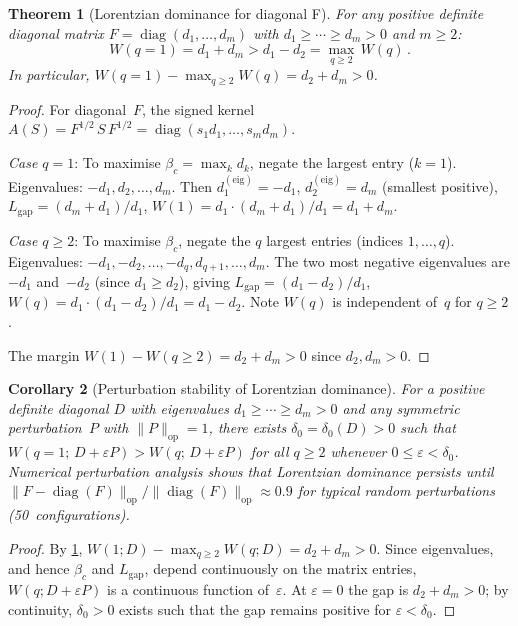 \documentclass[11pt]{article}
\newtheorem{theorem}{Theorem}[section]
\newtheorem{corollary}[theorem]{Corollary}
\theoremstyle{definition}
\theoremstyle{remark}
\begin{document}
\begin{theorem}[Lorentzian dominance for diagonal F]
\label{thm:diagonal-lorentzian}
For any positive definite diagonal matrix
$F = \operatorname{diag}(d_1, \ldots, d_m)$ with
$d_1 \geq \cdots \geq d_m > 0$ and $m \geq 2$:
\begin{equation}
\label{eq:diagonal-W-comparison}
W(q = 1) = d_1 + d_m > d_1 - d_2 = \max_{q \geq 2}\, W(q)\,.
\end{equation}
In particular, $W(q = 1) - \max_{q \geq 2} W(q) = d_2 + d_m > 0$.
\end{theorem}

\begin{proof}
For diagonal~$F$, the signed kernel
$A(S) = F^{1/2}\,S\,F^{1/2} = \operatorname{diag}(s_1 d_1,
\ldots, s_m d_m)$.

\emph{Case $q = 1$}: To maximise $\beta_c = \max_k d_k$,
negate the largest entry ($k = 1$).
Eigenvalues: $-d_1, d_2, \ldots, d_m$.
Then $d_1^{(\mathrm{eig})} = -d_1$,
$d_2^{(\mathrm{eig})} = d_m$ (smallest positive),
$L_{\mathrm{gap}} = (d_m + d_1)/d_1$,
$W(1) = d_1 \cdot (d_m + d_1)/d_1 = d_1 + d_m$.

\emph{Case $q \geq 2$}: To maximise $\beta_c$, negate the
$q$ largest entries (indices $1, \ldots, q$).
Eigenvalues: $-d_1, -d_2, \ldots, -d_q, d_{q+1}, \ldots, d_m$.
The two most negative eigenvalues are $-d_1$ and~$-d_2$
(since $d_1 \geq d_2$), giving
$L_{\mathrm{gap}} = (d_1 - d_2)/d_1$,
$W(q) = d_1 \cdot (d_1 - d_2)/d_1 = d_1 - d_2$.
Note $W(q)$ is independent of~$q$ for $q \geq 2$.

The margin $W(1) - W(q \geq 2) = d_2 + d_m > 0$ since
$d_2, d_m > 0$.
\end{proof}

\begin{corollary}[Perturbation stability of Lorentzian dominance]
\label{cor:lorentzian-perturbation}
For a positive definite diagonal $D$ with eigenvalues
$d_1 \geq \cdots \geq d_m > 0$ and any symmetric perturbation~$P$
with $\|P\|_{\mathrm{op}} = 1$, there exists
$\delta_0 = \delta_0(D) > 0$ such that
$W(q = 1;\,D + \varepsilon P) > W(q;\,D + \varepsilon P)$ for
all $q \geq 2$ whenever $0 \leq \varepsilon < \delta_0$.
Numerical perturbation analysis shows that Lorentzian dominance
persists until $\|F - \operatorname{diag}(F)\|_{\text{op}} /
\|\operatorname{diag}(F)\|_{\text{op}} \approx 0.9$
for typical random perturbations (50~configurations).
\end{corollary}

\begin{proof}
By \cref{thm:diagonal-lorentzian}, $W(1; D) - \max_{q \geq 2}
W(q; D) = d_2 + d_m > 0$.
Since eigenvalues, and hence $\beta_c$ and $L_{\mathrm{gap}}$,
depend continuously on the matrix entries, $W(q; D + \varepsilon P)$
is a continuous function of~$\varepsilon$.
At $\varepsilon = 0$ the gap is $d_2 + d_m > 0$; by continuity,
$\delta_0 > 0$ exists such that the gap remains positive
for $\varepsilon < \delta_0$.
\end{proof}
\end{document}
